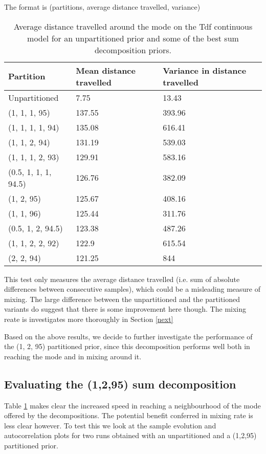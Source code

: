 The format is (partitions, average distance travelled, variance)

\begin{table}[H]
  \centering
  \begin{tabular}{lll}
    \toprule
    Partition & Mean distance travelled & Variance in distance travelled \\
    \midrule
    Unpartitioned & 7.75 & 13.43 \\
    (1, 1, 1, 95) & 137.55 & 393.96 \\
    (1, 1, 1, 1, 94) & 135.08 & 616.41 \\
    (1, 1, 2, 94) & 131.19 & 539.03 \\
    (1, 1, 1, 2, 93) & 129.91 & 583.16 \\
    (0.5, 1, 1, 1, 94.5) & 126.76 & 382.09 \\
    (1, 2, 95) & 125.67 & 408.16 \\
    (1, 1, 96) & 125.44 & 311.76 \\
    (0.5, 1, 2, 94.5) & 123.38 & 487.26 \\
    (1, 1, 2, 2, 92) & 122.9 & 615.54 \\
    (2, 2, 94) & 121.25 & 844 \\
    \bottomrule
  \end{tabular}
  \caption{Average distance travelled around the mode on the Tdf continuous model for an unpartitioned prior and some of the best sum decomposition priors.}
  \label{tab:bestParts}
\end{table}

This test only measures the average distance travelled (i.e. sum of absolute differences between consecutive samples), which could be a misleading measure of mixing. The large difference between the unpartitioned and the partitioned variants do suggest that there is some improvement here though. The mixing reate is investigates more thoroughly in Section \ref{next}

Based on the above results, we decide to further investigate the performance of the (1, 2, 95) partitioned prior, since this decomposition performs well both in reaching the mode and in mixing around it.

\subsection{Evaluating the (1,2,95) sum decomposition}

Table \ref{tab:bestParts} makes clear the increased speed in reaching a neighbourhood of the mode offered by the decompositions. The potential benefit conferred in mixing rate is less clear however. To test this we look at the sample evolution and autocorrelation plots for two runs obtained with an unpartitioned and a (1,2,95) partitioned prior.

